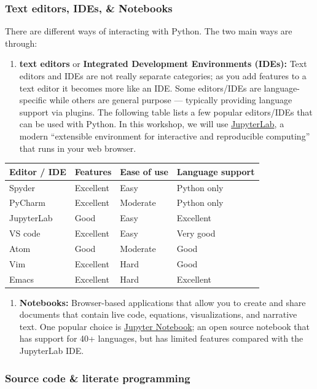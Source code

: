 \documentclass[
]{book}
\providecommand{\tightlist}{%
  \setlength{\itemsep}{0pt}\setlength{\parskip}{0pt}}
\begin{document}
\hypertarget{text-editors-ides-notebooks-1}{%
\subsubsection{Text editors, IDEs, \& Notebooks}\label{text-editors-ides-notebooks-1}}

There are different ways of interacting with Python. The two main ways are through:

\begin{enumerate}
\def\labelenumi{\arabic{enumi}.}
\tightlist
\item
  \textbf{text editors} or \textbf{Integrated Development Environments (IDEs):} Text editors and IDEs are not really separate categories; as you add features to a text editor it becomes more like an IDE. Some editors/IDEs are language-specific while others are general purpose --- typically providing language support via plugins. The following table lists a few popular editors/IDEs that can be used with Python. In this workshop, we will use \href{https://jupyter.org/}{JupyterLab}, a modern ``extensible environment for interactive and reproducible computing'' that runs in your web browser.
\end{enumerate}

\begin{longtable}[]{@{}llll@{}}
\toprule
Editor / IDE & Features & Ease of use & Language support\tabularnewline
\midrule
\endhead
Spyder & Excellent & Easy & Python only\tabularnewline
PyCharm & Excellent & Moderate & Python only\tabularnewline
JupyterLab & Good & Easy & Excellent\tabularnewline
VS code & Excellent & Easy & Very good\tabularnewline
Atom & Good & Moderate & Good\tabularnewline
Vim & Excellent & Hard & Good\tabularnewline
Emacs & Excellent & Hard & Excellent\tabularnewline
\bottomrule
\end{longtable}

\begin{enumerate}
\def\labelenumi{\arabic{enumi}.}
\setcounter{enumi}{1}
\tightlist
\item
  \textbf{Notebooks:} Browser-based applications that allow you to create and share documents that contain live code, equations, visualizations, and narrative text. One popular choice is \href{https://jupyter.org/}{Jupyter Notebook}; an open source notebook that has support for 40+ languages, but has limited features compared with the JupyterLab IDE.
\end{enumerate}

\hypertarget{source-code-literate-programming-1}{%
\subsubsection{Source code \& literate programming}\label{source-code-literate-programming-1}}
\end{document}
